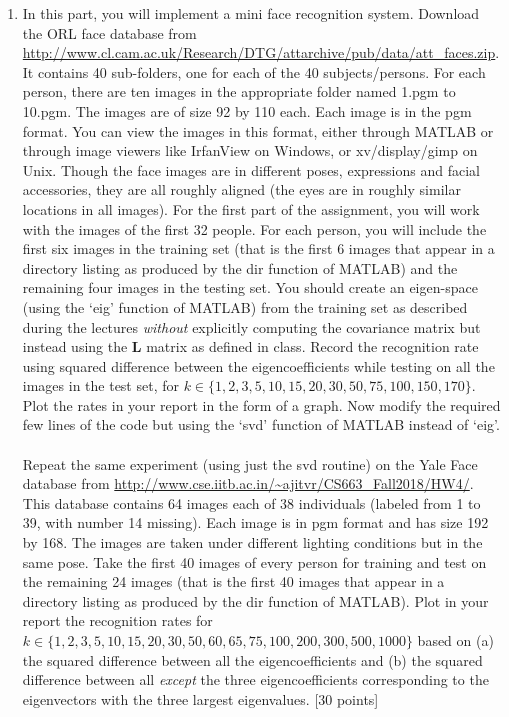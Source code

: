 \documentclass[11pt]{article}
\begin{document}
\begin{enumerate}
\item In this part, you will implement a mini face recognition system. Download the ORL face database from \url{http://www.cl.cam.ac.uk/Research/DTG/attarchive/pub/data/att_faces.zip}. It contains 40 sub-folders, one for each of the 40 subjects/persons. For each person, there are ten images in the appropriate folder named 1.pgm to 10.pgm. The images are of size 92 by 110 each. Each image is in the pgm format. You can view the images in this format, either through MATLAB or through image viewers like IrfanView on Windows, or xv/display/gimp on Unix. Though the face images are in different poses, expressions and facial accessories, they are all roughly aligned (the eyes are in roughly similar locations in all images). For the first part of the assignment, you will work with the images of the first 32 people. For each person, you will include the first six images in the training set (that is the first 6 images that appear in a directory listing as produced by the dir function of MATLAB) and the remaining four images in the testing set. You should create an eigen-space (using the `eig' function of MATLAB) from the training set as described during the lectures \emph{without} explicitly computing the covariance matrix but instead using the $\boldsymbol{L}$ matrix as defined in class. Record the recognition rate using squared difference between the eigencoefficients while testing on all the images in the test set, for $k \in \{1,2,3,5,10,15,20,30,50,75,100,150,170\}$. Plot the rates in your report in the form of a graph. Now modify the required few lines of the code but using the `svd' function of MATLAB instead of `eig'.
\\
\\
Repeat the same experiment (using just the svd routine) on the Yale Face database from \url{http://www.cse.iitb.ac.in/~ajitvr/CS663_Fall2018/HW4/}. This database contains 64 images each of 38 individuals (labeled from 1 to 39, with number 14 missing). Each image is in pgm format and has size 192 by 168. The images are taken under different lighting conditions but in the same pose. Take the first 40 images of every person for training and test on the remaining 24 images (that is the first 40 images that appear in a directory listing as produced by the dir function of MATLAB). Plot in your report the recognition rates for $k \in \{1,2,3,5,10,15,20,30,50,60, 65,75,100,200,300,500,1000\}$ based on (a) the squared difference between all the eigencoefficients and (b) the squared difference between all \emph{except} the three eigencoefficients corresponding to the eigenvectors with the three largest eigenvalues. \textsf{[30 points]}


\end{enumerate}
\end{document}

